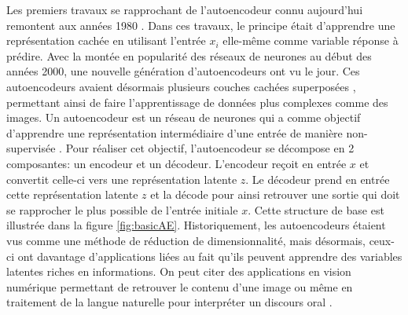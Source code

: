 Les premiers travaux se rapprochant de l'autoencodeur connu aujourd'hui remontent aux années 1980 \citep{Rumelhart-1986}. Dans ces travaux, le principe était d'apprendre une représentation cachée en utilisant l'entrée $x_i$ elle-même comme variable réponse à prédire. Avec la montée en popularité des réseaux de neurones au début des années 2000, une nouvelle génération d'autoencodeurs ont vu le jour. Ces autoencodeurs avaient désormais plusieurs couches cachées superposées \citep{HintonSalakhutdinov2006b}, permettant ainsi de faire l'apprentissage de données plus complexes comme des images. Un autoencodeur est un réseau de neurones qui a comme objectif d'apprendre une représentation intermédiaire d'une entrée de manière non-supervisée \citep{Goodfellow-et-al-2016}. Pour réaliser cet objectif, l'autoencodeur se décompose en 2 composantes: un encodeur et un décodeur. L'encodeur reçoit en entrée $x$ et convertit celle-ci vers une représentation latente $z$. Le décodeur prend en entrée cette représentation latente $z$ et la décode pour ainsi retrouver une sortie qui doit se rapprocher le plus possible de l'entrée initiale $x$. Cette structure de base est illustrée dans la figure \ref{fig:basicAE}. Historiquement, les autoencodeurs étaient vus comme une méthode de réduction de dimensionnalité, mais désormais, ceux-ci ont davantage d'applications liées au fait qu'ils peuvent apprendre des variables latentes riches en informations. On peut citer des applications en vision numérique permettant de retrouver le contenu d'une image \citep{conf/esann/KrizhevskyH11} ou même en traitement de la langue naturelle pour interpréter un discours oral \citep{inproceedings}. \newline

